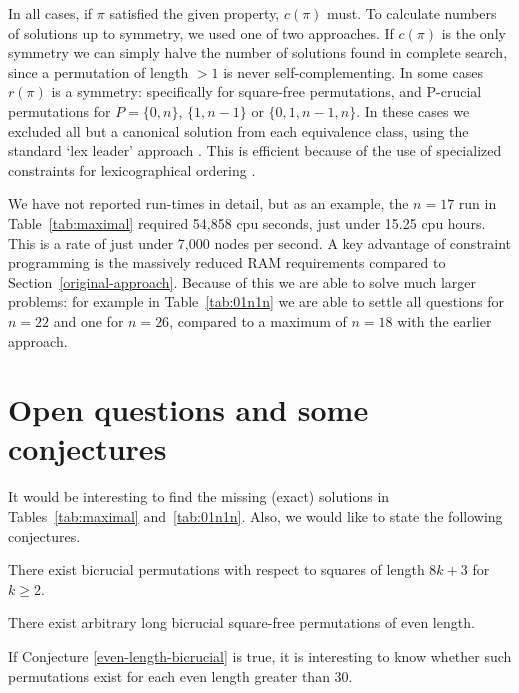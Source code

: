 \documentclass[12pt,reqno]{article}
\begin{document}
In all cases, if $\pi$ satisfied the given property, $c(\pi)$ must.  To calculate numbers of solutions up to symmetry, we used one of two approaches.  If $c(\pi)$ is the only symmetry we can simply halve the number of solutions found in complete search, since a permutation of length $>1$ is never self-complementing.   In some cases $r(\pi)$ is a symmetry: specifically for square-free permutations, and P-crucial permutations for $P = \{0,n\}$, $\{1,n-1\}$ or $\{0,1,n-1,n\}$.  
In these cases we excluded all but a canonical solution from each equivalence class, using the standard `lex leader' approach \cite{lexleader}.   This is efficient because of the use of specialized constraints for lexicographical ordering 
\cite{gaclex}. 

We have not reported run-times in detail, but as an example, the $n=17$ run in Table~\ref{tab:maximal} required  54,858 cpu seconds, just under 15.25 cpu hours.  This is a rate of just under 7,000 nodes per second.    A key advantage of constraint programming is the massively reduced RAM requirements compared to Section~\ref{original-approach}.    
Because of this we are able to solve much larger problems: for example in Table~\ref{tab:01n1n} we are able to settle all questions for $n=22$ and one for $n=26$, compared to a maximum of $n=18$ with  the earlier approach. 

\section{Open questions and some conjectures}\label{open}

It would be interesting to find the missing (exact) solutions in Tables~\ref{tab:maximal} and~\ref{tab:01n1n}.  Also, we would like to state the following conjectures.

\begin{conjecture}\label{bicrucials2} There exist bicrucial permutations with respect to squares of length $8k+3$ for $k\geq 2$.\end{conjecture}

\begin{conjecture}\label{even-length-bicrucial} There exist arbitrary long bicrucial square-free permutations of even length. \end{conjecture}

If Conjecture \ref{even-length-bicrucial} is true, it is interesting to know whether such permutations exist for each even length greater than 30. 
\end{document}
